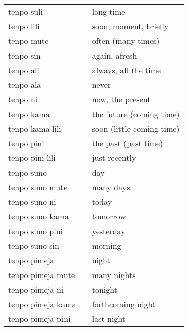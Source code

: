 \begin{supertabular}{p{5,5cm}|ll}
    tenpo suli                             &  & long time                 \\
    tenpo lili                             &  & soon, moment, briefly     \\
    tenpo mute                             &  & often (many times)        \\
    tenpo sin                              &  & again, afresh             \\
    tenpo ali                              &  & always, all the time      \\
    tenpo ala                              &  & never                     \\
    tenpo ni                               &  & now, the present          \\
    tenpo kama                             &  & the future (coming time)  \\
    tenpo kama lili                        &  & soon (little coming time) \\
    tenpo pini                             &  & the past (past time)      \\
    tenpo pini lili                        &  & just recently             \\
    tenpo suno                             &  & day                       \\
    tenpo suno mute                        &  & many days                 \\
    tenpo suno ni                          &  & today                     \\
    tenpo suno kama                        &  & tomorrow                  \\
    tenpo suno pini                        &  & yesterday                 \\
    tenpo suno sin                         &  & morning                   \\
    tenpo pimeja                           &  & night                     \\
    tenpo pimeja mute                      &  & many nights               \\
    tenpo pimeja ni                        &  & tonight                   \\
    tenpo pimeja kama                      &  & forthcoming night         \\
    tenpo pimeja pini                      &  & last night                \\

\end{supertabular}
